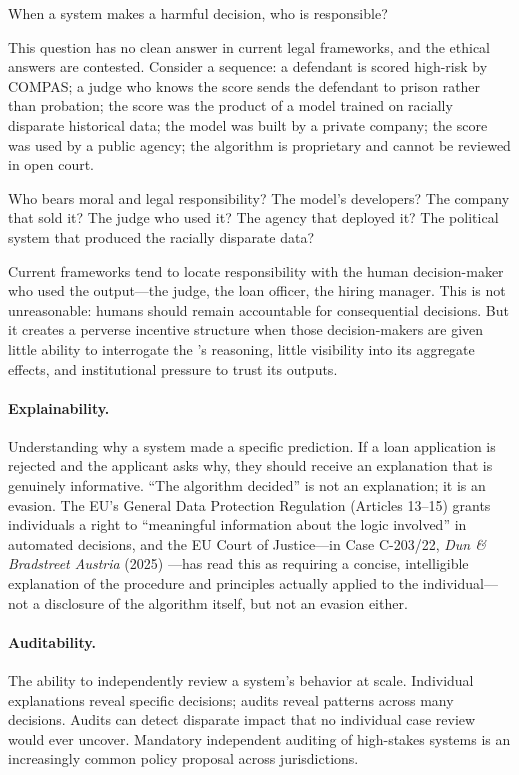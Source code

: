 When a \hitl system makes a harmful decision, who is responsible?

This question has no clean answer in current legal frameworks, and the ethical answers are contested. Consider a sequence: a defendant is scored high-risk by COMPAS; a judge who knows the score sends the defendant to prison rather than probation; the score was the product of a model trained on racially disparate historical data; the model was built by a private company; the score was used by a public agency; the algorithm is proprietary and cannot be reviewed in open court.

Who bears moral and legal responsibility? The model's developers? The company that sold it? The judge who used it? The agency that deployed it? The political system that produced the racially disparate data?

Current frameworks tend to locate responsibility with the human decision-maker who used the \ai output---the judge, the loan officer, the hiring manager. This is not unreasonable: humans should remain accountable for consequential decisions. But it creates a perverse incentive structure when those decision-makers are given little ability to interrogate the \ai's reasoning, little visibility into its aggregate effects, and institutional pressure to trust its outputs.

\paragraph{Explainability.} Understanding why a system made a specific prediction. If a loan application is rejected and the applicant asks why, they should receive an explanation that is genuinely informative. ``The algorithm decided'' is not an explanation; it is an evasion. The EU's General Data Protection Regulation (Articles 13--15) \autocite{eu2016gdpr} grants individuals a right to ``meaningful information about the logic involved'' in automated decisions, and the EU Court of Justice---in Case C-203/22, \emph{Dun \& Bradstreet Austria} (2025) \autocite{cjeu2025dunbradstreet}---has read this as requiring a concise, intelligible explanation of the procedure and principles actually applied to the individual---not a disclosure of the algorithm itself, but not an evasion either.

\paragraph{Auditability.} The ability to independently review a system's behavior at scale. Individual explanations reveal specific decisions; audits reveal patterns across many decisions. Audits can detect disparate impact that no individual case review would ever uncover. Mandatory independent auditing of high-stakes \ai systems is an increasingly common policy proposal across jurisdictions.

